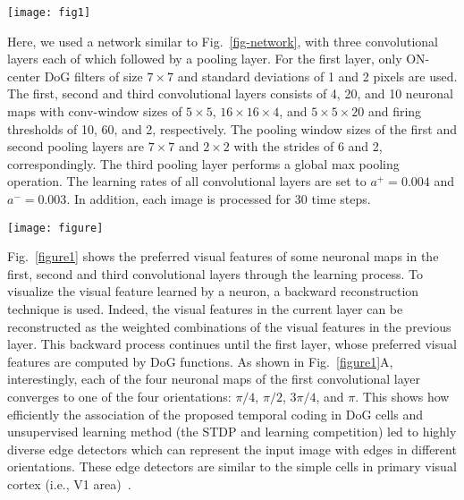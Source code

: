 \documentclass[preprint,5p,12pt,twocolumn]{article}
\begin{document}
\begin{figure*}[!htb]
\centering
\texttt{[image: fig1]}
\caption{ The synaptic changes of some neuronal maps in different layers through the learning with the Caltech face/motorbike dataset. A) The first convolutional layer becomes selective to oriented edges. B) The second convolutional layer converges to object parts. C) The third convolutional layer learns the object prototype and respond to whole objects.}
\label{figure1}
\end{figure*}

Here, we used a network similar to Fig.~\ref{fig-network}, with three convolutional layers each of which followed by a pooling layer.  For the first layer, only ON-center DoG filters of size $7 \times 7$ and standard deviations of 1 and 2 pixels are used. The first, second and third convolutional layers consists of 4, 20, and 10 neuronal maps with conv-window sizes of $5 \times 5$, $16 \times 16 \times 4$, and $5 \times 5 \times 20$ and firing thresholds of 10, 60, and 2, respectively. The pooling window sizes of the first and second pooling layers are $7 \times 7$ and $2 \times 2$ with the strides of 6 and 2, correspondingly. The third pooling layer performs a global max pooling operation. The learning rates of all convolutional layers are set to $a^{+}=0.004$ and $a^{-}=0.003$. In addition, each image is processed for 30 time steps.  %

\begin{figure*}[!htb]
\centering
\texttt{[image: figure]}
\caption{Each curve shows the variation of the convergence index through the learning of a convolutonal layer. The weight histogram of the first convolutional layer at some critical points during the learning are shown next to its convergence curve.}
\label{figure2_2}
\end{figure*}

Fig.~\ref{figure1} shows the preferred visual features of some neuronal maps in the first, second and third convolutional layers through the learning process. To visualize the visual feature learned by a neuron, a backward reconstruction technique is used. Indeed, the visual features in the current layer can be reconstructed as the weighted combinations of the visual features in the previous layer. This backward process continues until the first layer, whose preferred visual features are computed by DoG functions. As shown in Fig.~\ref{figure1}A, interestingly, each of the four neuronal maps of the first convolutional layer converges to one of the four orientations: $\pi/4$, $\pi/2$, $3\pi/4$, and $\pi$. This shows how efficiently the association of the proposed temporal coding in DoG cells and unsupervised learning method (the STDP and learning competition) led to highly diverse edge detectors which can represent the input image with edges in different orientations. These edge detectors are similar to the simple cells in primary visual cortex (i.e., V1 area)~\cite{delorme2001networks}.
\end{document}
